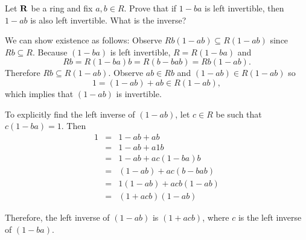 \begin{problem}
Let $\mathbf{R}$ be a ring and fix $a, b \in R$.  Prove that if $1 - ba$ is left
invertible, then $1 - ab$ is also left invertible.  What is the inverse?\\[4pt]
\end{problem}
\smallskip
\begin{solution}
We can show existence as follows: 
Observe $Rb(1-ab)\subseteq R(1-ab)$ since $Rb\subseteq R$.  Because $(1-ba)$ is left invertible, $R = R(1-ba)$ and
\[Rb=R(1-ba)b=R(b-bab)=Rb(1-ab).\] Therefore $Rb\subseteq R(1-ab)$. Observe $ab\in Rb$ and $(1-ab)\in R(1-ab)$ so \[1=(1-ab)+ab\in R(1-ab),\] which implies that $(1-ab)$ is invertible.

To explicitly find the left inverse of $(1-ab)$, let $c \in R$ be such that $c(1-ba) = 1$. Then
\begin{eqnarray*}
1 & = & 1 - ab + ab\\
& = & 1 - ab + a1b\\
& = & 1 - ab + ac(1-ba)b\\
& = & (1 - ab) + ac(b-bab)\\
& = & 1(1 - ab) + acb(1-ab)\\
& = & (1+acb)(1-ab)
\end{eqnarray*}

Therefore, the left inverse of $(1-ab)$ is $(1+acb)$, where $c$ is the left inverse of $(1-ba)$.



\end{solution}
\probskip




